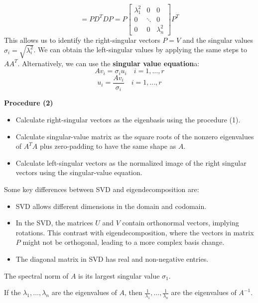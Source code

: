 \documentclass{article}
\begin{document}
$$=PD^TDP=P\begin{bmatrix}
    \lambda_1^2 & 0 & 0 \\ 
    0 & \ddots & 0 \\ 
    0 & 0 & \lambda_n^2
\end{bmatrix}P^T$$
This allows us to identify the right-singular vectors $P=V$ and the singular
values $\sigma_i=\sqrt{\lambda_i^2}$. We can obtain the left-singular values
by applying the same steps to $AA^T$. Alternatively, we can use the
\textbf{singular value equation}a:
$$Av_i=\sigma_iu_i\quad i=1,\ldots,r$$
$$u_i=\frac{Av_i}{\sigma_i}\quad i=1,\ldots,r$$
\begin{recap}
    \textbf{Procedure (2)}
    \begin{itemize}
        \item Calculate right-singular vectors as the eigenbasis using the
            procedure (1).
        \item Calculate singular-value matrix as the square roots of the
            nonzero eigenvalues of $A^TA$ plus zero-padding to have the same
            shape as $A$.
        \item Calculate left-singular vectors as the normalized image of the
            right singular vectors using the singular-value equation.
    \end{itemize}
\end{recap}
Some key differences between SVD and eigendecomposition are: 
\begin{itemize}
    \item SVD allows different dimensions in the domain and codomain.
    \item In the SVD, the matrices $U$ and $V$ contain orthonormal vectors,
        implying rotations. This contrast with eigendecomposition, where the
        vectors in matrix $P$ might not be orthogonal, leading to a more
        complex basis change.
    \item The diagonal matrix in SVD has real and non-negative entries.
\end{itemize}
\begin{theorem}\label{theo:spectral_norm_A}
   The spectral norm of $A$ is its largest singular value $\sigma_1$.
\end{theorem}
\begin{proposition}
    If the $\lambda_1,\ldots,\lambda_n$ are the eigenvalues of $A$, then
    $\frac{1}{\lambda_1},\ldots,\frac{1}{\lambda_n}$ are the eigenvalues of
    $A^{-1}$.
\end{proposition}
\end{document}
